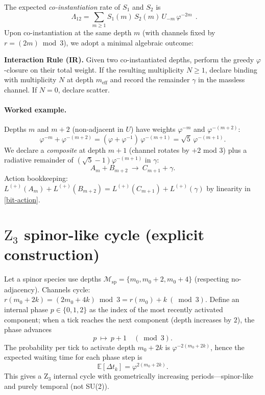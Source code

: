 \documentclass[11pt]{article}
\theoremstyle{remark}
\newcommand{\bb}[1]{\boxed{\;#1\;}}
\begin{document}
\label{sec:bind}
The expected \emph{co-instantiation} rate of $S_1$ and $S_2$ is
\begin{equation}\label{co}
\bb{\,\Lambda_{12}=\sum_{m\ge1} S_1(m)\,S_2(m)\,U_{-m}\,\varphi^{-2m}\,}.
\end{equation}
Upon co-instantiation at the same depth $m$ (with channels fixed by $r=(2m)\bmod3$), we adopt a minimal algebraic outcome:

\textbf{Interaction Rule (IR).} Given two co-instantiated depths, perform the greedy
$\varphi$-closure on their total weight. If the resulting multiplicity $N\ge 1$,
declare binding with multiplicity $N$ at depth $m_{\mathrm{eff}}$ and record the
remainder $\gamma$ in the massless channel. If $N=0$, declare scatter.

\paragraph{Worked example.}
Depths $m$ and $m{+}2$ (non-adjacent in $U$) have weights $\varphi^{-m}$ and $\varphi^{-(m+2)}$:
\begin{equation}\label{closure}
\varphi^{-m}+\varphi^{-(m+2)}=(\varphi+\varphi^{-1})\,\varphi^{-(m+1)}=\sqrt5\,\varphi^{-(m+1)}.
\end{equation}
We declare a \emph{composite} at depth $m{+}1$ (channel rotates by $+2$ mod 3) plus a radiative remainder of $(\sqrt5-1)\varphi^{-(m+1)}$ in $\gamma$:
\[
A_m+B_{m+2}\ \longrightarrow\ C_{m+1}+\gamma.
\]
Action bookkeeping: $L^{(+)}(A_m)+L^{(+)}(B_{m+2})=L^{(+)}(C_{m+1})+L^{(+)}(\gamma)$ by linearity in \eqref{bit-action}.

\section{\texorpdfstring{$\mathrm Z_3$}{Z3} spinor-like cycle (explicit construction)}\label{sec:spinor}
Let a spinor species use depths $\mathcal M_{\mathrm{sp}}=\{m_0,m_0{+}2,m_0{+}4\}$ (respecting no-adjacency).
Channels cycle:
\(
r(m_0{+}2k)=(2m_0{+}4k)\bmod3=r(m_0)+k\ (\bmod3).
\)
Define an internal phase $p\in\{0,1,2\}$ as the index of the most recently activated component; when a tick reaches the next component (depth increases by $2$), the phase advances
\begin{equation}
p\ \mapsto\ p+1\quad(\bmod 3).
\end{equation}
The probability per tick to activate depth $m_0{+}2k$ is $\varphi^{-2(m_0+2k)}$, hence the expected waiting time for each phase step is
\begin{equation}
\mathbb E[\Delta t_k]=\varphi^{2(m_0+2k)}.
\end{equation}
This gives a Z$_3$ internal cycle with geometrically increasing periods---spinor-like and purely temporal (not SU(2)).
\end{document}
